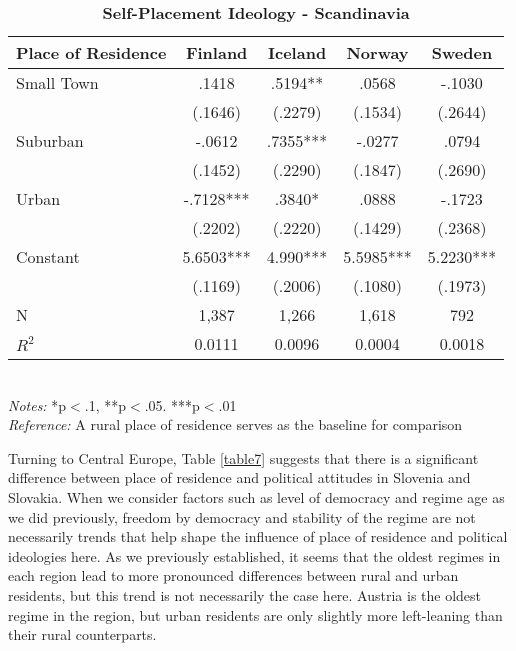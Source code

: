 \documentclass[12pt, titlepage]{article}
\newcommand\e{\emph}
\newcommand\tb{\textbf}
\begin{document}
\begin{singlespace}
	\begin{table}[H]
		\centering
		\caption{\tb{Self-Placement Ideology - Scandinavia}}
		\begin{tabulary}{\linewidth}{l c c c c}
			\\
			\hline
			\tb{Place of Residence}&\tb{Finland}&\tb{Iceland}&\tb{Norway}&\tb{Sweden} \\
			\hline
			Small Town&.1418&.5194**&.0568&-.1030 \\
			&(.1646)&(.2279)&(.1534)&(.2644) \\
			Suburban&-.0612&.7355***&-.0277&.0794 \\
			&(.1452)&(.2290)&(.1847)&(.2690) \\
			Urban&-.7128***&.3840*& .0888&-.1723\\
			&(.2202)&(.2220)&(.1429)&(.2368) \\
			Constant&5.6503***&4.990***&5.5985***&5.2230*** \\
			&(.1169)&(.2006)&(.1080)&(.1973) \\
			N&1,387&1,266&1,618&792\\
			$R^2$&0.0111&0.0096&0.0004&0.0018 \\
			\hline
		\end{tabulary}
		\\
		\e{Notes:} *p$<$.1, **p$<$.05. ***p$<$.01 \\
		\e{Reference:} A rural place of residence serves as the baseline for comparison
		\label{table6}
	\end{table}
\end{singlespace}

Turning to Central Europe, Table \ref{table7} suggests that there is a significant difference between place of residence and political attitudes in Slovenia and Slovakia. When we consider factors such as level of democracy and regime age as we did previously, freedom by democracy and stability of the regime are not necessarily trends that help shape the influence of place of residence and political ideologies here. As we previously established, it seems that the oldest regimes in each region lead to more pronounced differences between rural and urban residents, but this trend is not necessarily the case here. Austria is the oldest regime in the region, but urban residents are only slightly more left-leaning than their rural counterparts. 
\end{document}
